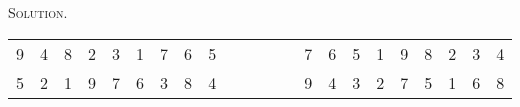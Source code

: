 \documentclass[12pt, a4paper, oneside]{article}
\newenvironment{solution}{\par\noindent\textsc{Solution. }}{\\\par}
\begin{document}
\begin{solution}
\begin{table}[]
\begin{tabular}{llllll|l|l|l|lll|l|l|l|llllll}
				\multicolumn{1}{|l|}{9} & \multicolumn{1}{l|}{4} & \multicolumn{1}{l|}{8} & \multicolumn{1}{l|}{2} & \multicolumn{1}{l|}{3} & 1 & 7 & 6 & 5 & ~                      & ~                      & ~ & 7 & 6 & 5 & \multicolumn{1}{l|}{1} & \multicolumn{1}{l|}{9} & \multicolumn{1}{l|}{8} & \multicolumn{1}{l|}{2} & \multicolumn{1}{l|}{3} & \multicolumn{1}{l|}{4} \\ \cline{1-9} \cline{13-21} 
				\multicolumn{1}{|l|}{5} & \multicolumn{1}{l|}{2} & \multicolumn{1}{l|}{1} & \multicolumn{1}{l|}{9} & \multicolumn{1}{l|}{7} & 6 & 3 & 8 & 4 & ~                      & ~                      & ~ & 9 & 4 & 3 & \multicolumn{1}{l|}{2} & \multicolumn{1}{l|}{7} & \multicolumn{1}{l|}{5} & \multicolumn{1}{l|}{1} & \multicolumn{1}{l|}{6} & \multicolumn{1}{l|}{8} \\ \cline{1-9} \cline{13-21} 
			\end{tabular}
		\end{table}
	\end{solution}
	\clearpage
\end{document}
